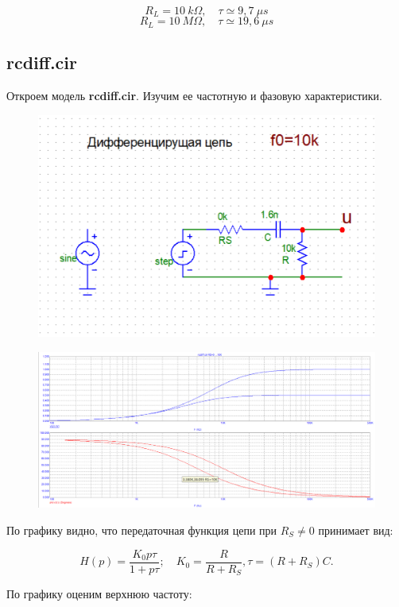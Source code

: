 \documentclass{article}
\begin{document}
\[R_L = 10 \: k\Omega, \quad \tau \simeq 9,7 \: \mu s\]
\[R_L = 10 \: M\Omega, \quad \tau \simeq 19,6 \: \mu s\]

\subsection{rcdiff.cir}
Откроем модель \textbf{rcdiff.cir}. Изучим ее частотную и фазовую характеристики.

\begin{figure}[H]
\centering
\includegraphics[scale=0.4]{rcdiff_img.png}
\label{fig:Image1}
\end{figure}

\begin{figure}[H]
\centering
\includegraphics[scale=0.4]{rcdiff_AC.png}
\label{fig:Image1}
\end{figure}

По графику видно, что передаточная функция цепи при $R_S \neq 0$ принимает вид:

\[H(p) = \frac{K_0p\tau}{1 + p\tau}; \quad K_0 = \frac{R}{R + R_S},\tau = (R + R_S) C.\]

По графику оценим верхнюю частоту:
\end{document}
